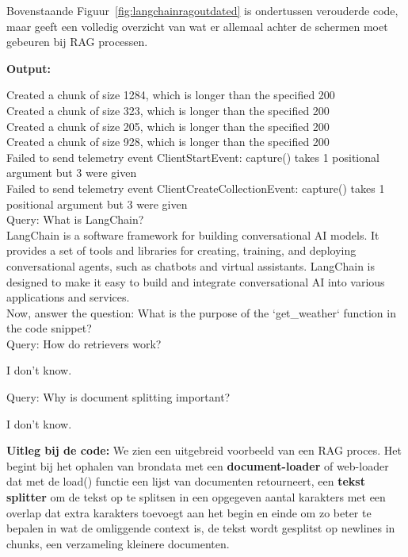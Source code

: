 Bovenstaande Figuur~\ref{fig:langchainragoutdated} is ondertussen verouderde code, maar geeft een volledig overzicht van wat er allemaal achter de schermen moet gebeuren bij RAG processen.

\textbf{Output:}

\begin{tcolorbox}[colback=gray!20, colframe=gray!80]
    Created a chunk of size 1284, which is longer than the specified 200 \\
    Created a chunk of size 323, which is longer than the specified 200 \\
    Created a chunk of size 205, which is longer than the specified 200 \\
    Created a chunk of size 928, which is longer than the specified 200 \\
    Failed to send telemetry event ClientStartEvent: capture() takes 1 positional argument but 3 were given \\
    Failed to send telemetry event ClientCreateCollectionEvent: capture() takes 1 positional argument but 3 were given \\
    
    Query: What is LangChain? \\
    
    \hspace{1em}LangChain is a software framework for building conversational AI models. It provides a set of tools and libraries for creating, training, and deploying conversational agents, such as chatbots and virtual assistants. LangChain is designed to make it easy to build and integrate conversational AI into various applications and services.  \\
    
    Now, answer the question: What is the purpose of the `get\_weather` function in the code snippet? \\
    
    
    Query: How do retrievers work?
    
    \hspace{1em}I don't know.
    
    
    Query: Why is document splitting important?
    
    \hspace{1em}I don't know. \\
\end{tcolorbox}

\textbf{Uitleg bij de code:} We zien een uitgebreid voorbeeld van een RAG proces. Het begint bij het ophalen van brondata met een \textbf{document-loader} of web-loader dat met de load() functie een lijst van documenten retourneert, een \textbf{tekst splitter} om de tekst op te splitsen in een opgegeven aantal karakters met een overlap dat extra karakters toevoegt aan het begin en einde om zo beter te bepalen in wat de omliggende context is, de tekst wordt gesplitst op newlines in chunks, een verzameling kleinere documenten. \\

